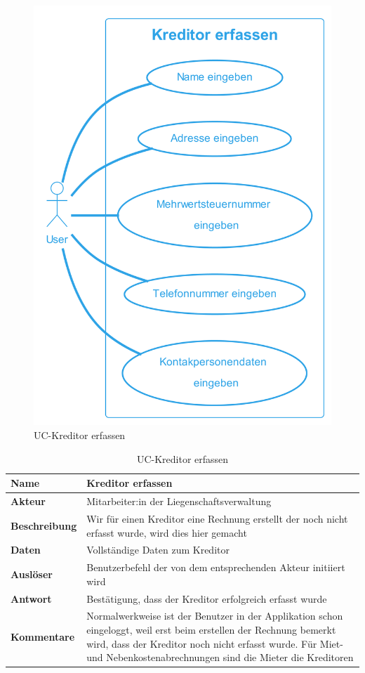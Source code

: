 \begin{figure}[H]
  \begin{center}
    \includegraphics[width=0.5\linewidth]{content/diagrams/out/usecase/kreditorErfassen/Kreditor erfassen.png}
    \caption{UC-Kreditor erfassen}
    \label{kreditorErfassen}
  \end{center}
\end{figure}

\begin{table}[H]
  \centering
  \settowidth{}
  \setlength\extrarowheight{2pt}
  \begin{tabulary}{1.0\textwidth}{|a|m{14cm}|}
    \hline
    \textbf{Name}& Kreditor erfassen\\
    \hline
    \textbf{Akteur}& Mitarbeiter:in der Liegenschaftsverwaltung\\
    \hline 
    \textbf{Beschreibung} & Wir für einen Kreditor eine Rechnung erstellt der noch nicht erfasst wurde, wird dies hier gemacht\\
    \hline
    \textbf{Daten} & Vollständige Daten zum Kreditor\\
    \hline
    \textbf{Auslöser} & Benutzerbefehl der von dem entsprechenden Akteur initiiert wird\\
    \hline
    \textbf{Antwort} & Bestätigung, dass der Kreditor erfolgreich erfasst wurde\\
    \hline
    \textbf{Kommentare} & Normalwerkweise ist der Benutzer in der Applikation schon eingeloggt, weil erst beim erstellen der Rechnung bemerkt wird, dass der Kreditor noch nicht erfasst wurde. Für Miet-und Nebenkostenabrechnungen sind die Mieter die Kreditoren \\
    \hline
  \end{tabulary}
  \caption{UC-Kreditor erfassen}
\end{table}
